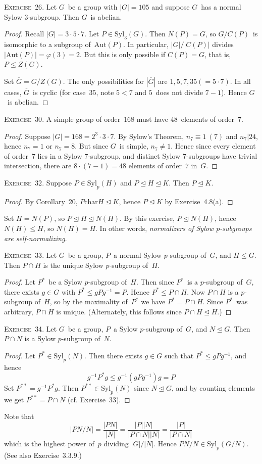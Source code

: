 \documentclass[letterpaper]{article}
\newcommand{\exercise}[1]{\goodbreak\noindent\textsc{Exercise~{#1}.}}
\newcommand{\sect}{\cap}
\newcommand{\subgroup}{\le}
\newcommand{\normal}{\trianglelefteq}
\newcommand{\aut}{\mathrm{Aut}}
\newcommand{\chr}{\mathrel{\mathrm{char}}}
\newcommand{\syl}{\mathrm{Syl}}
\newcommand{\res}[1]{\overline{#1}}
\newcommand{\ord}[1]{|{#1}|}
\begin{document}
\exercise{26}
Let $G$~be a group with $\ord{G}=105$ and suppose $G$~has a normal Sylow $3$-subgroup. Then $G$~is abelian.
\begin{proof}
Recall $\ord{G}=3\cdot 5\cdot 7$. Let $P\in\syl_3(G)$. Then $N(P)=G$, so $G/C(P)$~is isomorphic to a subgroup of~$\aut(P)$. In particular, $\ord{G}/\ord{C(P)}$ divides $\ord{\aut(P)}=\varphi(3)=2$. But this is only possible if $C(P)=G$, that is, $P\subgroup Z(G)$.

Set $\res{G}=G/Z(G)$. The only possibilities for $\ord{\res{G}}$ are $1,5,7,35(=5\cdot 7)$. In all cases, $\res{G}$~is cyclic (for case~$35$, note $5<7$ and $5$~does not divide $7-1$). Hence $G$~is abelian.
\end{proof}

\exercise{30}
A simple group of order~$168$ must have $48$~elements of order~$7$.
\begin{proof}
Suppose $\ord{G}=168=2^3\cdot 3\cdot 7$. By Sylow's Theorem, $n_7\equiv1\ (7)$ and $n_7|24$, hence $n_7=1$ or $n_7=8$. But since $G$~is simple, $n_7\ne 1$. Hence since every element of order~$7$ lies in a Sylow $7$-subgroup, and distinct Sylow $7$-subgroups have trivial intersection, there are $8\cdot(7-1)=48$ elements of order~$7$ in~$G$.
\end{proof}

\exercise{32}
Suppose $P\in\syl_p(H)$ and $P\normal H\normal K$. Then $P\normal K$.
\begin{proof}
By Corollary~20, $P\chr H\normal K$, hence $P\normal K$ by Exercise~4.8(a).
\end{proof}
\noindent Set $H=N(P)$, so $P\normal H\normal N(H)$. By this exercise, $P\normal N(H)$, hence $N(H)\subgroup H$, so $N(H)=H$. In other words, \emph{normalizers of Sylow $p$-subgroups are self-normalizing}.

\bigskip
\exercise{33}
Let $G$~be a group, $P$~a normal Sylow $p$-subgroup of~$G$, and $H\subgroup G$. Then $P\sect H$ is the unique Sylow $p$-subgroup of~$H$.
\begin{proof}
Let $P^*$~be a Sylow $p$-subgroup of~$H$. Then since $P^*$~is a $p$-subgroup of~$G$, there exists $g\in G$ with $P^*\subgroup gPg^{-1}=P$. Hence $P^*\subgroup P\sect H$. Now $P\sect H$ is a $p$-subgroup of~$H$, so by the maximality of~$P^*$ we have $P^*=P\sect H$. Since $P^*$~was arbitrary, $P\sect H$ is unique. (Alternately, this follows since $P\sect H\normal H$.)
\end{proof}

\exercise{34}
Let $G$~be a group, $P$~a Sylow $p$-subgroup of~$G$, and $N\normal G$. Then $P\sect N$ is a Sylow $p$-subgroup of~$N$.
\begin{proof}
Let $P^*\in\syl_p(N)$. Then there exists $g\in G$ such that $P^*\subgroup gPg^{-1}$, and hence
$$g^{-1}P^*g\subgroup g^{-1}(gPg^{-1})g=P$$
Set $P^{**}=g^{-1}P^*g$. Then $P^{**}\in\syl_p(N)$ since $N\normal G$, and by counting elements we get $P^{**}=P\sect N$ (cf. Exercise~33).
\end{proof}
\noindent Note that
$$\ord{PN/N}=\frac{\ord{PN}}{\ord{N}}=\frac{\ord{P}\ord{N}}{\ord{P\sect N}\ord{N}}=\frac{\ord{P}}{\ord{P\sect N}}$$
which is the highest power of~$p$ dividing $\ord{G}/\ord{N}$. Hence $PN/N\in\syl_p(G/N)$. (See also Exercise~3.3.9.)
\end{document}
